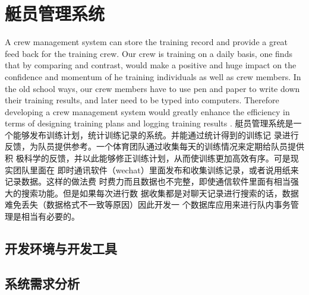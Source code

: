 \chapter{艇员管理系统}
A crew management system can store the training record and provide a great feed
back for the training crew. Our crew is training on a daily basis, one finds
that by comparing and contrast, would make a positive and huge impact on the
confidence and momentum of he training individuals as well as crew members.
In the old school ways, our crew members have to use pen and paper to write down
their training results, and later need to be typed into computers. Therefore
developing a crew management system would greatly enhance the efficiency in
terms of designing training plans and logging training results
.
艇员管理系统是一个能够发布训练计划，统计训练记录的系统。并能通过统计得到的训练记
录进行反馈，为队员提供参考。一个体育团队通过收集每天的训练情况来定期给队员提供积
极科学的反馈，并以此能够修正训练计划，从而使训练更加高效有序。可是现实团队里面在
即时通讯软件（wechat）里面发布和收集训练记录，或者说用纸来记录数据。这样的做法费
时费力而且数据也不完整，即使通信软件里面有相当强大的搜索功能。但是如果每次进行数
据收集都是对聊天记录进行搜索的话，数据难免丢失（数据格式不一致等原因）因此开发一
个数据库应用来进行队内事务管理是相当有必要的。

\newpage

\section{开发环境与开发工具}

\section{系统需求分析}%
        
        
